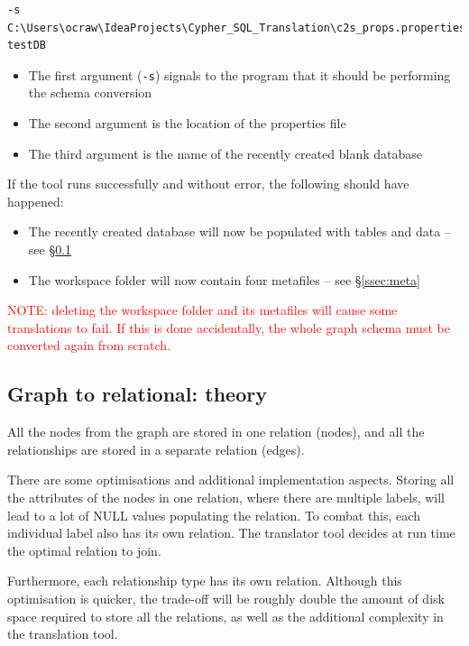 \documentclass[letterpaper]{ltxdoc}
\begin{document}
\medskip

\begin{verbatim}
-s C:\Users\ocraw\IdeaProjects\Cypher_SQL_Translation\c2s_props.properties testDB
\end{verbatim}

\medskip

\begin{itemize}
\item The first argument (\texttt{-s}) signals to the program that it should be performing the schema conversion
\item The second argument is the location of the properties file
\item The third argument is the name of the recently created blank database
\end{itemize}

\medskip

If the tool runs successfully and without error, the following should have happened:

\begin{itemize}
\item The recently created database will now be populated with tables and data -- see \S \ref{ssec:grreltheory}
\item The workspace folder will now contain four metafiles -- see \S \ref{ssec:meta}
\end{itemize}

\medskip

\textcolor{red}{NOTE: deleting the workspace folder and its metafiles will cause some translations to fail. If this is done accidentally, the whole graph schema must be converted again from scratch.}


\subsection{Graph to relational: theory}
\label{ssec:grreltheory}
All the nodes from the graph are stored in one relation (nodes), and all the relationships are stored in a separate relation (edges).

There are some optimisations and additional implementation aspects. Storing all the attributes of the nodes in one relation, where there are multiple labels, will lead to a lot of NULL values populating the relation. To combat this, each individual label also has its own relation. The translator tool decides at run time the optimal relation to join.

Furthermore, each relationship type has its own relation. Although this optimisation is quicker, the trade-off will be roughly double the amount of disk space required to store all the relations, as well as the additional complexity in the translation tool.
\end{document}
